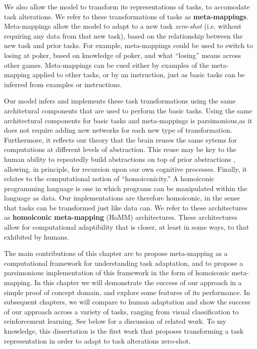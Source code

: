 We also allow the model to transform its representations of tasks, to accomodate task alterations. We refer to these transformations of tasks as \textbf{meta-mappings}. Meta-mappings allow the model to adapt to a new task \emph{zero-shot} (i.e. without requiring any data from that new task), based on the relationship between the new task and prior tasks. For example, meta-mappings could be used to switch to losing at poker, based on knowledge of poker, and what ``losing'' means across other games. Meta-mappings can be cued either by examples of the meta-mapping applied to other tasks, or by an instruction, just as basic tasks can be inferred from examples or instructions. 

Our model infers and implements these task transformations using the same architetural components that are used to perform the basic tasks. Using the same architectural components for basic tasks and meta-mappings is parsimonious,as it does not require adding new networks for each new type of transformation. Furthermore, it reflects our theory that the brain reuses the same sytems for computations at different levels of abstraction. This reuse may be key to the human ability to repeatedly build abstractions on top of prior abstractions \citep{Wilensky1991, Hazzan1999, Lampinen2017b}, allowing, in principle, for recursion upon our own cognitive processes. Finally, it relates to the computational notion of ``homoiconicity.'' A homoiconic programming language is one in which programs can be manipulated within the language as data. Our implementations are therefore homoiconic, in the sense that tasks can be transformed just like data can. We refer to these architectures as \textbf{homoiconic meta-mapping} (HoMM) architectures. These architectures allow for computational adaptibility that is closer, at least in some ways, to that exhibited by humans.  

The main contributions of this chapter are to propose meta-mapping as a computational framework for understanding task adaptation, and to propose a parsimonious implementation of this framework in the form of homoiconic meta-mapping. In this chapter we will demonstrate the success of our approach in a simple proof of concept domain, and explore some features of its performance. In subsequent chapters, we will compare to human adaptation and show the success of our approach across a variety of tasks, ranging from visual classification to reinforcement learning. See below for a discussion of related work. To my knowledge, this dissertation is the first work that proposes transforming a task representation in order to adapt to task alterations zero-shot. 


